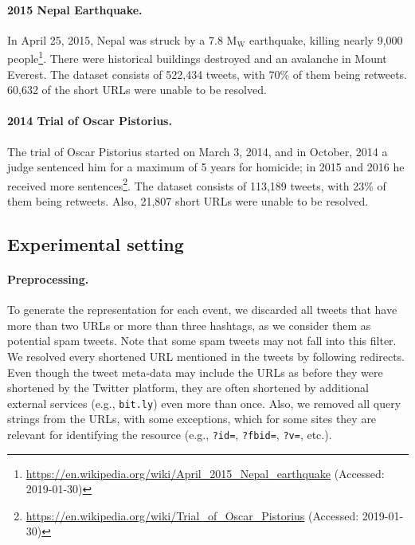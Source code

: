 
\paragraph{2015 Nepal Earthquake.} 
%
In April 25, 2015, Nepal was struck by a 7.8 $\text{M}_\text{W}$ earthquake,
killing nearly 9,000
people\footnote{\url{https://en.wikipedia.org/wiki/April_2015_Nepal_earthquake}
(Accessed: 2019-01-30)}. There were historical buildings destroyed and an avalanche
in Mount Everest.
%
The dataset consists of 522,434 tweets, with 70\% of them being retweets.
%
60,632 of the short URLs were unable to be resolved.


\paragraph{2014 Trial of Oscar Pistorius.} 
%
The trial of Oscar Pistorius started on March 3, 2014, and in October, 2014 a
judge sentenced him for a maximum of 5 years for homicide; in 2015 and 2016 he
received more
sentences\footnote{\url{https://en.wikipedia.org/wiki/Trial_of_Oscar_Pistorius}
(Accessed: 2019-01-30)}.
% 
The dataset consists of 113,189 tweets, with 23\% of them being retweets.
%
Also, 21,807 short URLs were unable to be resolved.





\subsection{Experimental setting}

\paragraph{Preprocessing.}
%
To generate the representation for each event, we discarded all tweets that have
more than two URLs or more than three hashtags, as we consider them as potential
spam tweets. 
%
Note that some spam tweets may not fall into this filter.
%
We resolved every shortened URL mentioned in the tweets by following redirects. 
%
Even though the tweet meta-data may include the URLs as before they were
shortened by the Twitter platform, they are often shortened by additional
external services (e.g., {\tt bit.ly}) even more than once.
%
Also, we removed all query strings from the URLs, with some exceptions, which
for some sites they are relevant for identifying the resource (e.g., {\tt ?id=},
{\tt ?fbid=}, {\tt ?v=}, etc.).

